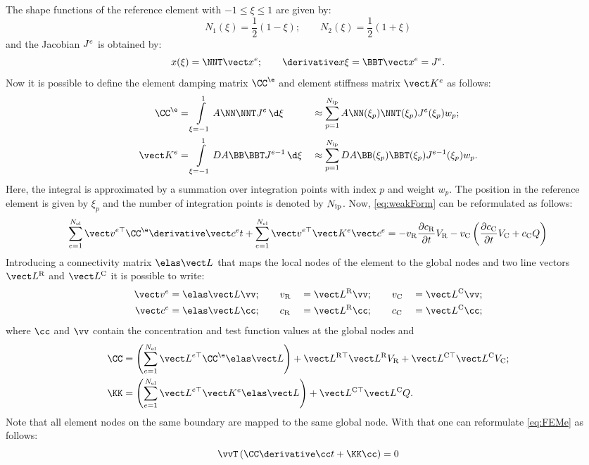   The shape functions of the reference element with $-1\le\xi\le 1$ are given by:
  \begin{equation}
    N_1(\xi) = \frac{1}{2}(1-\xi); \qquad N_2(\xi) = \frac{1}{2}(1+\xi)
  \end{equation}
  and the Jacobian $J^{e}$ is obtained by:
  \begin{equation}
    x(\xi) = \NNT\xxe ; \qquad \dxDxi = \BBT \xxe = \Je.
  \end{equation}
  Now it is possible to define the element damping matrix $\CCe$ and element stiffness matrix $\KKe$ as follows:
  \begin{alignat}{2}
    \CCe &= \intXi A \NN \NNT \Je \,\d\xi&&\approx \sumip A \NN(\xi_p) \NNT(\xi_p) \Je(\xi_p) w_p; \label{eq:CCe}\\
    \KKe &= \intXi D A \BB \BBT \Jeinv \,\d\xi&&\approx \sumip D A \BB(\xi_p) \BBT(\xi_p) \Jeinv(\xi_p) w_p. \label{eq:KKe}
  \end{alignat}
  Here, the integral is approximated by a summation over integration points with index $p$ and weight $w_p$. The position in the reference element is given by $\xi_p$ and the number of integration points is denoted by $N_{\rm ip}$. Now, \cref{eq:weakForm} can be reformulated as follows:
  \begin{equation}
     \sumel \vveT \CCe \dcceDt + \sumel \vveT \KKe \cce = - \vR \frac{\partial \cR}{\partial t} \VR - \vC \left( \frac{\partial \cC}{\partial t} \VC + \cC Q\right)
     \label{eq:FEMe}
  \end{equation}
  Introducing a connectivity matrix $\LLe$ that maps the local nodes of the element to the global nodes and two line vectors $\LLR$ and $\LLC$ it is possible to write:
  \begin{alignat}{3}
    \vve &= \LLe \vv; \qquad \vR &&= \LLR \vv; \qquad \vC &&= \LLC \vv; \\
    \cce &= \LLe \cc; \qquad \cR &&= \LLR \cc; \qquad \cC &&= \LLC \cc;
  \end{alignat}
  where $\cc$ and $\vv$ contain the concentration and test function values at the global nodes and
  \begin{align}
    \CC &= \left(\sumel \LLeT \CCe \LLe\right) + \LLRT\LLR\VR + \LLCT\LLC\VC; \\
    \KK &= \left(\sumel \LLeT \KKe \LLe\right) + \LLCT\LLC Q.
  \end{align}
  Note that all element nodes on the same boundary are mapped to the same global node. With that one can reformulate \cref{eq:FEMe} as follows:
  \begin{equation}
    \vvT \left(\CC \dccDt + \KK \cc \right) = 0 \label{eq:FEM}
  \end{equation}
